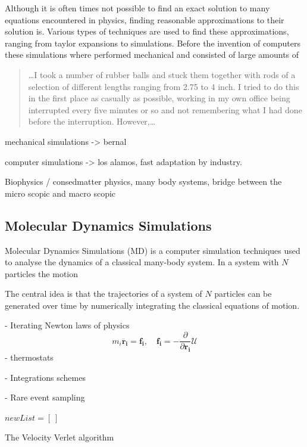 Although it is often times not possible to find an exact solution to many equations
encountered in physics, finding reasonable approximations to their solution is. Various
types of
techniques are used to find these approximations, ranging from taylor expansions to
simulations.
Before the invention of computers these simulations where performed mechanical and
consisted of large amounts of

 \begin{quote}
\dots I took a number of rubber balls and stuck them together with rods of a
selection of different lengths ranging from 2.75 to 4 inch. I tried to do this in the
first place as casually as possible, working in my own office being interrupted every
five minutes or so and not remembering what I had done before the interruption.
However,\dots
\end{quote}

mechanical simulations -> bernal

computer simulations -> los alamos, fast adaptation by industry.

Biophysics / consedmatter physics, many body systems, bridge between the micro scopic and
macro scopic


\subsection{Molecular Dynamics Simulations}
Molecular Dynamics Simulations (MD) is a computer simulation techniques used to analyse
the dynamics of a classical many-body system. In a system with $N$ particles the motion



The central idea is that
the trajectories of a system of $N$ particles can be generated over time by numerically
integrating the classical equations of motion.




- Iterating Newton laws of physics
\[
    m_i \boldsymbol{\ddot{r_i}} = \boldsymbol{f_i}, \quad \boldsymbol{f_i} = -
    \frac{\partial}{\partial \boldsymbol{r_i}} \mathcal{U}
\]
- thermostats

- Integrations schemes

- Rare event sampling

\begin{algorithm}


    $newList = [\ ]$


    \caption{The Velocity Verlet algorithm}
\end{algorithm}

